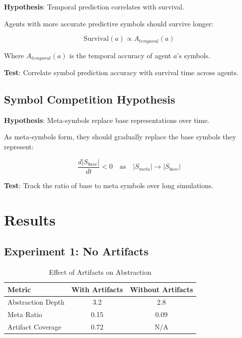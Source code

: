\documentclass[11pt,a4paper]{article}
\begin{document}
\textbf{Hypothesis}: Temporal prediction correlates with survival.

Agents with more accurate predictive symbols should survive longer:

\begin{equation}
\text{Survival}(a) \propto A_{temporal}(a)
\end{equation}

Where $A_{temporal}(a)$ is the temporal accuracy of agent $a$'s symbols.

\textbf{Test}: Correlate symbol prediction accuracy with survival time across agents.

\subsection{Symbol Competition Hypothesis}

\textbf{Hypothesis}: Meta-symbols replace base representations over time.

As meta-symbols form, they should gradually replace the base symbols they represent:

\begin{equation}
\frac{d |S_{base}|}{dt} < 0 \quad \text{as} \quad |S_{meta}| \rightarrow |S_{base}|
\end{equation}

\textbf{Test}: Track the ratio of base to meta symbols over long simulations.

\section{Results}

\subsection{Experiment 1: No Artifacts}

\begin{table}[htbp]
\centering
\caption{Effect of Artifacts on Abstraction}
\label{tab:artifacts}
\begin{tabular}{@{}lcc@{}}
\toprule
\textbf{Metric} & \textbf{With Artifacts} & \textbf{Without Artifacts} \\
\midrule
Abstraction Depth & 3.2 & 2.8 \\
Meta Ratio & 0.15 & 0.09 \\
Artifact Coverage & 0.72 & N/A \\
\bottomrule
\end{tabular}
\end{table}
\end{document}
